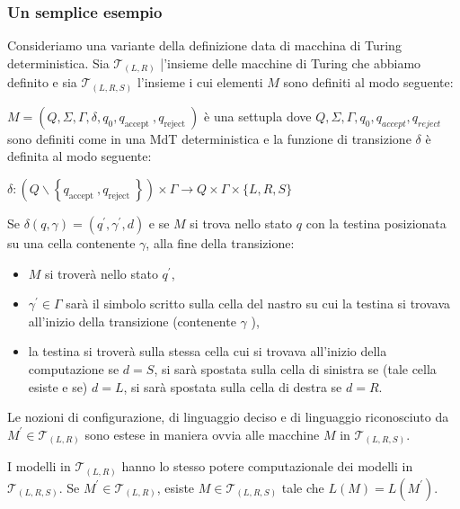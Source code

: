 \subsubsection{Un semplice esempio}

Consideriamo una variante della definizione data di macchina di Turing deterministica. Sia $\mathcal{T}_{(L, R)}$ |'insieme delle macchine di Turing che abbiamo definito e sia $\mathcal{T}_{(L, R, S)}$ l'insieme i cui elementi $M$ sono definiti al modo seguente:

$M=\left(Q, \Sigma, \Gamma, \delta, q_{0}, q_{\text {accept }}, q_{\text {reject }}\right)$ è una settupla dove $Q, \Sigma, \Gamma, q_{0}, q_{a c c e p t}, q_{r e j e c t}$ sono definiti come in una MdT deterministica e la funzione di transizione $\delta$ è definita al modo seguente:

$\delta:\left(Q \backslash\left\{q_{\text {accept }}, q_{\text {reject }}\right\}\right) \times \Gamma \rightarrow Q \times \Gamma \times\{L, R, S\}$

\vspace{5mm}

Se $\delta(q, \gamma)=\left(q^{\prime}, \gamma^{\prime}, d\right)$ e se $M$ si trova nello stato $q$ con la testina posizionata su una cella contenente $\gamma$, alla fine della transizione:
\begin{itemize}
    \item $M$ si troverà nello stato $q^{\prime}$,
    \item $\gamma^{\prime} \in \Gamma$ sarà il simbolo scritto sulla cella del nastro su cui la testina si trovava all'inizio della transizione (contenente $\gamma$ ),
    \item la testina si troverà sulla stessa cella cui si trovava all'inizio della computazione se $d=S$, si sarà spostata sulla cella di sinistra se (tale cella esiste e se) $d=L$, si sarà spostata sulla cella di destra se $d=R$.
\end{itemize}

Le nozioni di configurazione, di linguaggio deciso e di linguaggio riconosciuto da $M^{\prime} \in \mathcal{T}_{(L, R)}$ sono estese in maniera ovvia alle macchine $M$ in $\mathcal{T}_{(L, R, S)}$.

\vspace{5mm}

I modelli in $\mathcal{T}_{(L, R)}$ hanno lo stesso potere computazionale dei modelli in $\mathcal{T}_{(L, R, S)}$.
Se $M^{\prime} \in \mathcal{T}_{(L, R)}$, esiste $M \in \mathcal{T}_{(L, R, S)}$ tale che $L(M)=L\left(M^{\prime}\right)$.

